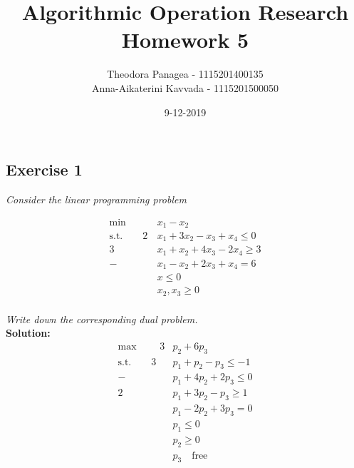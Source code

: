 \documentclass[12pt]{article}
\title{Algorithmic Operation Research \\ Homework 5}
\date{9-12-2019}
\author{Theodora Panagea - 1115201400135 \\ Anna-Aikaterini Kavvada - 1115201500050}
\begin{document}
	\maketitle{}
 
 \newpage
\subsection*{Exercise 1}
\textit{Consider the linear programming problem}

\begin{align*}
\text{min } \qquad &x_1 - x_2 \\
\text{s.t.} \qquad 2&x_1 + 3x_2 -x_3 + x_4 \leqslant 0 \\
						    3&x_1 + x_2 + 4x_3 - 2x_4 \geqslant 3 \\
						    -&x_1 - x_2 +2x_3 + x_4 = 6 \\
						    &x \leqslant 0 \\
						    &x_2, x_3 \geqslant 0
\end{align*}
\\
\textit{Write down the corresponding dual problem.}
\\
\textbf{Solution:} \\  	
\begin{align*}
\text{max } \qquad 3&p_2 + 6p_3 \\
\text{s.t.} \qquad 3&p_1 + p_2 - p_3 \leqslant -1 \\
						    -&p_1 + 4p_2 + 2p_3 \leqslant 0 \\
						    2&p_1 + 3p_2 - p_3 \geqslant 1 \\
						    &p_1 - 2p_2 + 3p_3 = 0 \\
						    &p_1 \leqslant 0 \\
						    &p_2 \geqslant 0 \\
						    &p_3 \quad \text{free}
\end{align*}
  	
  	
\newpage

\end{document}
